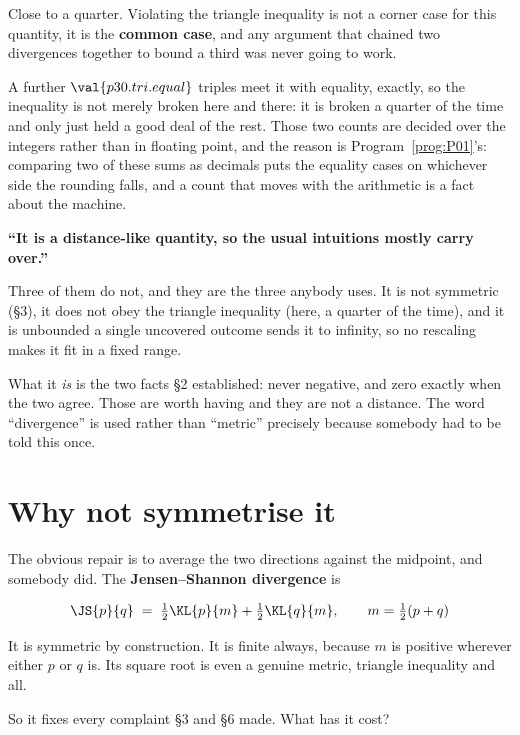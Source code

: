 \begin{fr}

Close to a quarter. Violating the triangle inequality is not a corner case
for this quantity, it is the \textbf{common case}, and any argument that
chained two divergences together to bound a third was never going to work.

A further $\val{p30.tri.equal}$ triples meet it with equality, exactly, so
the inequality is not merely broken here and there: it is broken a quarter of
the time and only just held a good deal of the rest. Those two counts are
decided over the integers rather than in floating point, and the reason is
Program~\ref{prog:P01}'s: comparing two of these sums as decimals puts the
equality cases on whichever side the rounding falls, and a count that moves
with the arithmetic is a fact about the machine.

\begin{trapbox}
\textbf{\enquote{It is a distance-like quantity, so the usual intuitions
mostly carry over.}}

Three of them do not, and they are the three anybody uses. It is not
symmetric (§3), it does not obey the triangle inequality (here, a quarter of
the time), and it is unbounded \dash{} a single uncovered outcome sends it to
infinity, so no rescaling makes it fit in a fixed range.

What it \emph{is} is the two facts §2 established: never negative, and zero
exactly when the two agree. Those are worth having and they are not a
distance. The word \enquote{divergence} is used rather than \enquote{metric}
precisely because somebody had to be told this once.
\end{trapbox}

\end{fr}

\section{Why not symmetrise it}
\label{sec:P30-js}

\begin{fr}
The obvious repair is to average the two directions against the midpoint, and
somebody did. The \textbf{Jensen--Shannon divergence} is

\[ \JS{p}{q} \;=\; \tfrac12 \KL{p}{m} + \tfrac12 \KL{q}{m},
   \qquad m = \tfrac12(p + q) \]

It is symmetric by construction. It is finite always, because $m$ is
positive wherever either $p$ or $q$ is. Its square root is even a genuine
metric, triangle inequality and all.

So it fixes every complaint §3 and §6 made. What has it cost?
\dotline
\nextframe
\end{fr}

